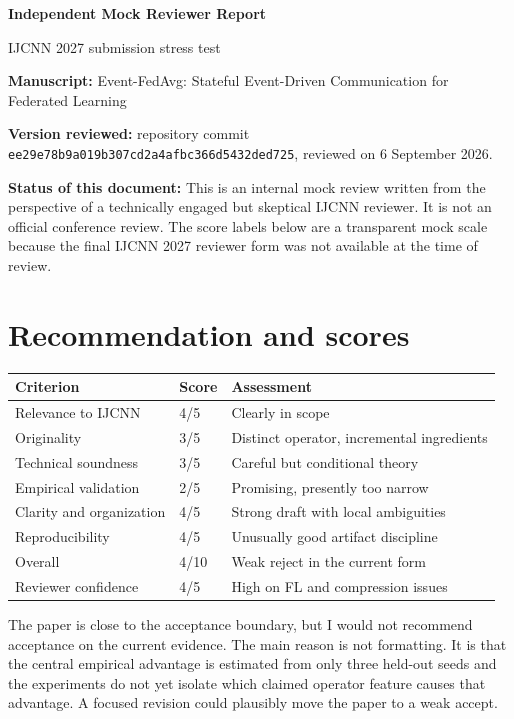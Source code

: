 \documentclass[10pt]{article}
\newcommand{\paperTitle}{Event-FedAvg: Stateful Event-Driven Communication for Federated Learning}
\newcommand{\decision}{Weak reject in the current form}
\begin{document}
\begin{center}
  {\Large\bfseries Independent Mock Reviewer Report}\par
  \vspace{4pt}
  {\large IJCNN 2027 submission stress test}\par
\end{center}

\textbf{Manuscript:} \paperTitle

\textbf{Version reviewed:}
repository commit \texttt{ee29e78b9a019b307cd2a4afbc366d5432ded725},
reviewed on 6 September 2026.

\textbf{Status of this document:} This is an internal mock review written from
the perspective of a technically engaged but skeptical IJCNN reviewer. It is
not an official conference review. The score labels below are a transparent
mock scale because the final IJCNN 2027 reviewer form was not available at the
time of review.

\section*{Recommendation and scores}

\begin{center}
\begin{tabular}{@{}p{}p{}p{}@{}}
\toprule
Criterion & Score & Assessment \\
\midrule
Relevance to IJCNN & 4/5 & Clearly in scope \\
Originality & 3/5 & Distinct operator, incremental ingredients \\
Technical soundness & 3/5 & Careful but conditional theory \\
Empirical validation & 2/5 & Promising, presently too narrow \\
Clarity and organization & 4/5 & Strong draft with local ambiguities \\
Reproducibility & 4/5 & Unusually good artifact discipline \\
Overall & 4/10 & \decision \\
Reviewer confidence & 4/5 & High on FL and compression issues \\
\bottomrule
\end{tabular}
\end{center}

The paper is close to the acceptance boundary, but I would not recommend
acceptance on the current evidence. The main reason is not formatting. It is
that the central empirical advantage is estimated from only three held-out
seeds and the experiments do not yet isolate which claimed operator feature
causes that advantage. A focused revision could plausibly move the paper to a
weak accept.
\end{document}
